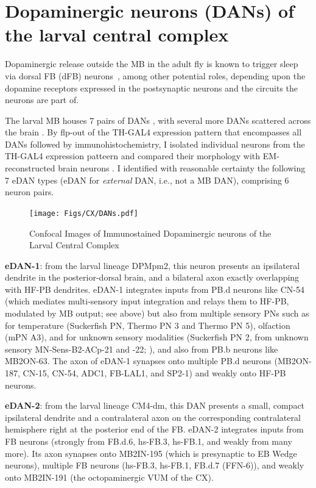  \section{Dopaminergic neurons (DANs) of the larval central complex}
\label{CXDANs}
    Dopaminergic release outside the MB in the adult fly is known to trigger sleep via dorsal FB (dFB) neurons~\citep{pimentel2016sleep}, among other potential roles, depending upon the dopamine receptors expressed in the postsynaptic neurons and the circuits the neurons are part of.

    The larval MB houses 7 pairs of DANs \citep{eichler2017complete}, with several more DANs scattered across the brain \citep{selcho2009thgal4}. By flp-out of the TH-GAL4 expression pattern that encompasses all DANs \citep{selcho2009thgal4} followed by immunohistochemistry, I isolated individual neurons from the TH-GAL4 expression patteern and compared their morphology with EM-reconstructed brain neurons \citep{winding2023connectome}. I identified with reasonable certainty the following 7 eDAN types (eDAN for \textit{external} DAN, i.e., not a MB DAN), comprising 6 neuron pairs.
    
    \begin{figure}
        \centering
        \texttt{[image: Figs/CX/DANs.pdf]}
        \caption{Confocal Images of Immunostained Dopaminergic neurons of the Larval Central Complex}
        \label{DANs}
    \end{figure}

    \textbf{eDAN-1}: from the larval lineage DPMpm2, this neuron presents an ipsilateral dendrite in the posterior-dorsal brain, and a bilateral axon exactly overlapping with HF-PB dendrites. eDAN-1 integrates inputs from PB.d neurons like CN-54 (which mediates multi-sensory input integration and relays them to HF-PB, modulated by MB output; see above) but also from multiple sensory PNs such as for temperature (Suckerfish PN, Thermo PN 3 and Thermo PN 5), olfaction (mPN A3), and for unknown sensory modalities (Suckerfish PN 2, from unknown sensory MN-Sens-B2-ACp-21 and -22; \citep{miroschnikow2018convergence}), and also from PB.b neurons like MB2ON-63. The axon of eDAN-1 synapses onto multiple PB.d neurons (MB2ON-187, CN-15, CN-54, ADC1, FB-LAL1, and SP2-1) and weakly onto HF-PB neurons.

    \textbf{eDAN-2}: from the larval lineage CM4-dm, this DAN presents a small, compact ipsilateral dendrite and a contralateral axon on the corresponding contralateral hemisphere right at the posterior end of the FB. eDAN-2 integrates inputs from FB neurons (strongly from FB.d.6, hs-FB.3, hs-FB.1, and weakly from many more). Its axon synapses onto MB2IN-195 (which is presynaptic to EB Wedge neurons), multiple FB neurons (hs-FB.3, hs-FB.1, FB.d.7 (FFN-6)), and weakly onto MB2IN-191 (the octopaminergic VUM of the CX).

